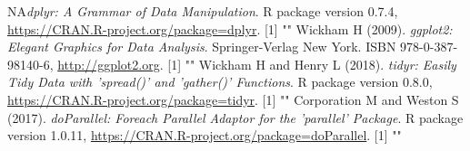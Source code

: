 NA\emph{dplyr: A Grammar of Data Manipulation}.
R package version 0.7.4, \url{https://CRAN.R-project.org/package=dplyr}.
[1] "\n"
Wickham H (2009).
\emph{ggplot2: Elegant Graphics for Data Analysis}.
Springer-Verlag New York.
ISBN 978-0-387-98140-6, \url{http://ggplot2.org}.
[1] "\n"
Wickham H and Henry L (2018).
\emph{tidyr: Easily Tidy Data with 'spread()' and 'gather()' Functions}.
R package version 0.8.0, \url{https://CRAN.R-project.org/package=tidyr}.
[1] "\n"
Corporation M and Weston S (2017).
\emph{doParallel: Foreach Parallel Adaptor for the 'parallel' Package}.
R package version 1.0.11, \url{https://CRAN.R-project.org/package=doParallel}.
[1] "\n"
